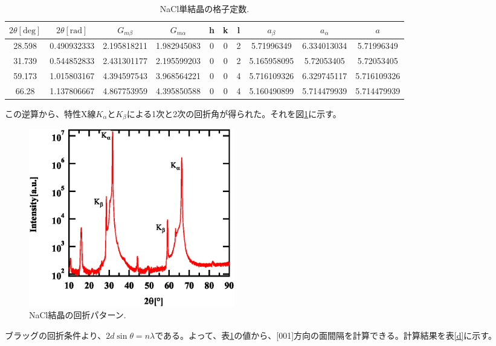 \documentclass[11pt,a4j,uplatex]{jsarticle}
\begin{document}
\begin{table}[htbp]
 \begin{center}
  \caption{NaCl単結晶の格子定数.}
  \begin{tabular}{|c|c|c|c|ccc|c|c|c|}  \hline
   $2\theta[\mathrm{deg}]$ & $2\theta[\mathrm{rad}]$ & $G_{m\beta}$ & $G_{m\alpha}$ & h & k & l & $a_\beta$   & $a_\alpha$  & $a$         \\   \hline  \hline
   28.598                  & 0.490932333             & 2.195818211  & 1.982945083   & 0 & 0 & 2 & 5.71996349  & 6.334013034 & 5.71996349  \\
   31.739                  & 0.544852833             & 2.431301177  & 2.195599203   & 0 & 0 & 2 & 5.165958095 & 5.72053405  & 5.72053405  \\
   59.173                  & 1.015803167             & 4.394597543  & 3.968564221   & 0 & 0 & 4 & 5.716109326 & 6.329745117 & 5.716109326 \\
   66.28                   & 1.137806667             & 4.867753959  & 4.395850588   & 0 & 0 & 4 & 5.160490899 & 5.714479939 & 5.714479939 \\  \hline
  \end{tabular}
  \label{crystal}
 \end{center}
\end{table}

この逆算から、特性X線$K_\alpha$と$K_\beta$による1次と2次の回折角が得られた。それを図\ref{kakb}に示す。

\begin{figure}[htb]
 \centering
 \includegraphics[clip,width=9cm]{kakb.eps}
 \caption{NaCl結晶の回折パターン.}
 \label{kakb}
\end{figure}

\newpage

ブラッグの回折条件より、$2d\sin\theta=n\lambda$である。よって、表\ref{kakb}の値から、[001]方向の面間隔を計算できる。計算結果を表\ref{d}に示す。
\end{document}
